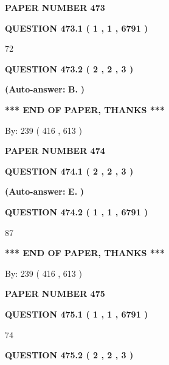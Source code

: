 \documentclass{ctexart}
\begin{document}
   
\newpage 
\setcounter{page}{ 
   473001 } 
   
   
 {\textbf{ \Large{ PAPER NUMBER  473  }}}
   
   
   
   
  
  
{\textbf{\large{QUESTION
473.1 
 ( 1 , 1 , 6791 )
}}}

72
  
  
{\textbf{\large{QUESTION
473.2 
 ( 2 , 2 , 3 )
}}}
 
 
{\textbf{(Auto-answer:}}
{\textbf{\large{
B.}}}
{\textbf{)}}
 
 
   
   
   
   
\vspace{1.0in} 
{\textbf{\large{ *** END OF PAPER, THANKS *** }}} 
   
   
\hspace{1.0in} By: 
 239 ( 416 ,  613 )
   
   
   
   
\newpage 
\setcounter{page}{ 
   474001 } 
   
   
 {\textbf{ \Large{ PAPER NUMBER  474  }}}
   
   
   
   
  
  
{\textbf{\large{QUESTION
474.1 
 ( 2 , 2 , 3 )
}}}
 
 
{\textbf{(Auto-answer:}}
{\textbf{\large{
E.}}}
{\textbf{)}}
 
 
  
  
{\textbf{\large{QUESTION
474.2 
 ( 1 , 1 , 6791 )
}}}

87
   
   
   
   
\vspace{1.0in} 
{\textbf{\large{ *** END OF PAPER, THANKS *** }}} 
   
   
\hspace{1.0in} By: 
 239 ( 416 ,  613 )
   
   
   
   
\newpage 
\setcounter{page}{ 
   475001 } 
   
   
 {\textbf{ \Large{ PAPER NUMBER  475  }}}
   
   
   
   
  
  
{\textbf{\large{QUESTION
475.1 
 ( 1 , 1 , 6791 )
}}}

74
  
  
{\textbf{\large{QUESTION
475.2 
 ( 2 , 2 , 3 )
}}}
 
\end{document}

